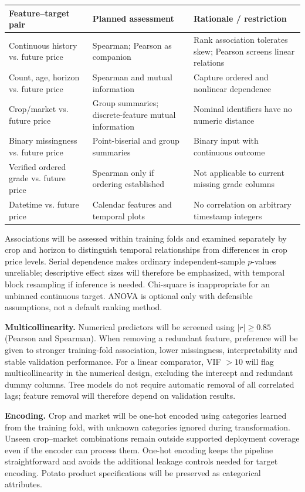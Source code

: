 \documentclass[11pt,a4paper]{article}
\begin{document}
\begin{tabularx}{\textwidth}{@{}p{34mm}LL@{}}\toprule
Feature--target pair & Planned assessment & Rationale / restriction\\\midrule
Continuous history vs. future price & Spearman; Pearson as companion & Rank association tolerates skew; Pearson screens linear relations\\
Count, age, horizon vs. future price & Spearman and mutual information & Capture ordered and nonlinear dependence\\
Crop/market vs. future price & Group summaries; discrete-feature mutual information & Nominal identifiers have no numeric distance\\
Binary missingness vs. future price & Point-biserial and group summaries & Binary input with continuous outcome\\
Verified ordered grade vs. future price & Spearman only if ordering established & Not applicable to current missing grade columns\\
Datetime vs. future price & Calendar features and temporal plots & No correlation on arbitrary timestamp integers\\\bottomrule
\end{tabularx}

Associations will be assessed within training folds and examined separately by crop and horizon to distinguish temporal relationships from differences in crop price levels. Serial dependence makes ordinary independent-sample $p$-values unreliable; descriptive effect sizes will therefore be emphasized, with temporal block resampling if inference is needed. Chi-square is inappropriate for an unbinned continuous target. ANOVA is optional only with defensible assumptions, not a default ranking method.

\textbf{Multicollinearity.} Numerical predictors will be screened using $|r|\geq0.85$ (Pearson and Spearman). When removing a redundant feature, preference will be given to stronger training-fold association, lower missingness, interpretability and stable validation performance. For a linear comparator, VIF $>10$ will flag multicollinearity in the numerical design, excluding the intercept and redundant dummy columns. Tree models do not require automatic removal of all correlated lags; feature removal will therefore depend on validation results.

\textbf{Encoding.} Crop and market will be one-hot encoded using categories learned from the training fold, with unknown categories ignored during transformation. Unseen crop--market combinations remain outside supported deployment coverage even if the encoder can process them. One-hot encoding keeps the pipeline straightforward and avoids the additional leakage controls needed for target encoding. Potato product specifications will be preserved as categorical attributes.
\end{document}
